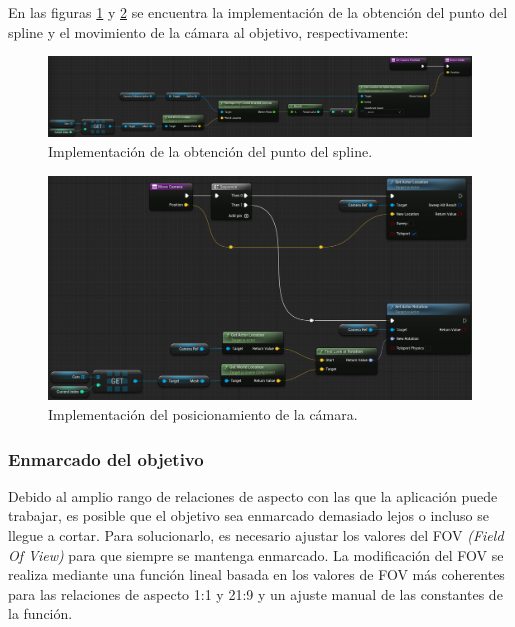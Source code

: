\bigskip

En las figuras \ref{fig:bp-cam1} y \ref{fig:bp-cam2} se encuentra la implementación de la obtención del punto del spline y el movimiento de la cámara al objetivo, respectivamente:

\begin{figure}[H]
    \includegraphics[width=\textwidth]{imagenes/blueprints/CameraFollower.getCameraPosition.png}
    \caption{Implementación de la obtención del punto del spline.}
    \label{fig:bp-cam1}
\end{figure}

\begin{figure}[H]
    \includegraphics[width=\textwidth]{imagenes/blueprints/CameraFollower.moveCamera.png}
    \caption{Implementación del posicionamiento de la cámara.}
    \label{fig:bp-cam2}
\end{figure}

\subsubsection{Enmarcado del objetivo}

Debido al amplio rango de relaciones de aspecto con las que la aplicación puede trabajar, es posible que el objetivo sea enmarcado demasiado lejos o incluso se llegue a cortar. Para solucionarlo, es necesario ajustar los valores del FOV \textit{(Field Of View)} para que siempre se mantenga enmarcado. La modificación del FOV se realiza mediante una función lineal basada en los valores de FOV más coherentes para las relaciones de aspecto 1:1 y 21:9 y un ajuste manual de las constantes de la función. 

